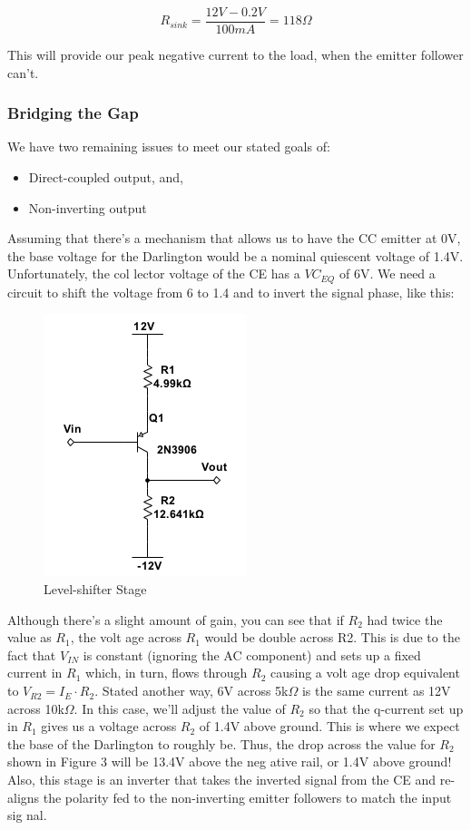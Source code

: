 \documentclass[journal]{IEEEtran}
\begin{document}
\begin{equation}
R_{sink} = \frac{12V - 0.2V}{100mA} = 118\Omega
\end{equation}

This will provide our peak negative current to the load, when the emitter follower can’t.

\subsubsection{Bridging the Gap}

We have two remaining issues to meet our stated goals of:

\begin{itemize}
\item
Direct-coupled output, and,
\item
Non-inverting output
\end{itemize}

Assuming that there’s a mechanism that allows us to have the CC emitter at 0V, the base
voltage for the Darlington would be a nominal quiescent voltage of 1.4V. Unfortunately, the col
lector voltage of the CE has a $VC_{EQ}$ of 6V. We need a circuit to shift the voltage from 6 to 1.4 and
to invert the signal phase, like this:

\begin{figure}[H]
\centering
\includegraphics[scale=.6]{shift-stage.png}
\caption{Level-shifter Stage}
\label{fig_ls_stage}
\end{figure}

Although there’s a slight amount of gain, you can see that if $R_{2}$ had twice the value as $R_{1}$, the volt
age across $R_{1}$ would be double across R2. This is due to the fact that $V_{IN}$ is constant (ignoring the
AC component) and sets up a fixed current in $R_{1}$ which, in turn, flows through $R_{2}$ causing a volt
age drop equivalent to $V_{R2} = I_{E}\cdot R_{2}$. Stated another way, 6V across 5k$\Omega$ is the same current as
12V across 10k$\Omega$. In this case, we’ll adjust the value of $R_{2}$ so that the q-current set up in $R_{1}$ gives
us a voltage across $R_{2}$ of 1.4V above ground. This is where we expect the base of the Darlington to
roughly be. Thus, the drop across the value for $R_{2}$ shown in Figure 3 will be 13.4V above the neg
ative rail, or 1.4V above ground! Also, this stage is an inverter that takes the inverted signal from
the CE and re-aligns the polarity fed to the non-inverting emitter followers to match the input sig
nal.
\end{document}
